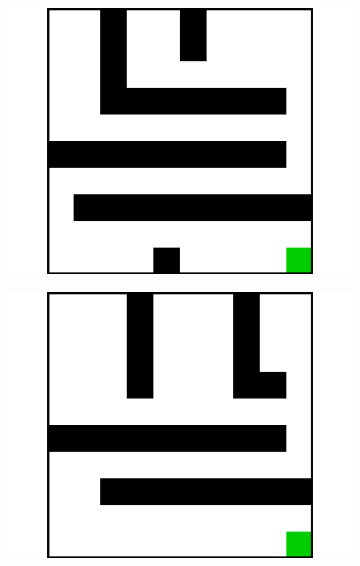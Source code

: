 \documentclass{article}
\begin{document}
\begin{figure}[t]
\begin{subfigure}[t]{0.18\textwidth}
    \includegraphics[width=\textwidth]{images/maze/maze17.pdf}
    \caption{}
  \end{subfigure}
  \begin{subfigure}[t]{0.18\textwidth}
    \includegraphics[width=\textwidth]{images/maze/maze18.pdf}
    \caption{}
  \end{subfigure}
  \begin{subfigure}[t]{0.18\textwidth}

\end{subfigure}
\end{figure}
\end{document}
